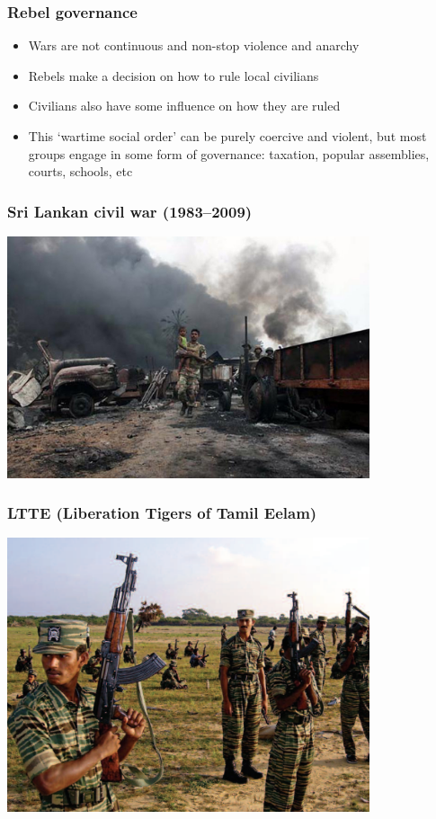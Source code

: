 \documentclass[utf8, xcolor=dvipsnames]{beamer}
\begin{document}
\begin{frame}
\frametitle{Rebel governance}
\centering

\begin{itemize}
  \item<1-> Wars are not continuous and non-stop violence and anarchy
  \item<2-> Rebels make a decision on how to rule local civilians
  \item<2-> Civilians also have some influence on how they are ruled
  \item<3-> This `wartime social order' can be purely coercive and violent, but most groups engage in some form of governance: taxation, popular assemblies, courts, schools, etc
\end{itemize}

\end{frame}

\begin{frame}
\frametitle{Sri Lankan civil war (1983--2009)}
\centering

\includegraphics[width = 0.8\textwidth]{img/sri_lanka_war}

\end{frame}

\begin{frame}
\frametitle{LTTE (Liberation Tigers of Tamil Eelam)}
\centering

\includegraphics[width = 0.8\textwidth]{img/ltte}

\end{frame}
\end{document}
